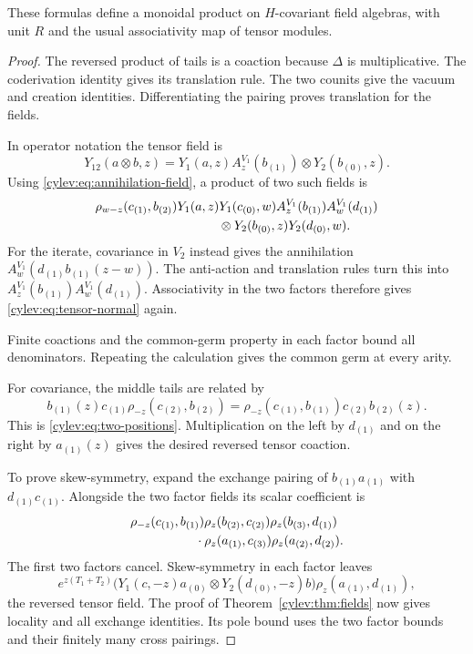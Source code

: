 \begin{theorem}\label{cylev:thm:tensor}
These formulas define a monoidal product on $H$-covariant field
algebras, with unit $R$ and the usual associativity map of tensor
modules.
\end{theorem}
\begin{proof}
The reversed product of tails is a coaction because $\Delta$ is
multiplicative. The coderivation identity gives its translation rule.
The two counits give the vacuum and creation identities.
Differentiating the pairing proves translation for the fields.

In operator notation the tensor field is
\[
 Y_{12}(a\otimes b,z)
       =Y_1(a,z)A_z^{V_1}(b_{(1)})\otimes Y_2(b_{(0)},z).
\]
Using \eqref{cylev:eq:annihilation-field}, a product of two such
fields is
\begin{equation}\label{cylev:eq:tensor-normal}
\begin{split}
 &\rho_{w-z}(c_{(1)},b_{(2)})
   Y_1(a,z)Y_1(c_{(0)},w)
   A_z^{V_1}(b_{(1)})A_w^{V_1}(d_{(1)})\\
 &\hspace{34mm}\otimes Y_2(b_{(0)},z)Y_2(d_{(0)},w).
\end{split}
\end{equation}
For the iterate, covariance in $V_2$ instead gives the annihilation
$A_w^{V_1}(d_{(1)}b_{(1)}(z-w))$.
The anti-action and translation rules turn this into
$A_z^{V_1}(b_{(1)})A_w^{V_1}(d_{(1)})$.
Associativity in the two factors therefore gives
\eqref{cylev:eq:tensor-normal} again.

Finite coactions and the common-germ property in each factor bound
all denominators. Repeating the calculation gives the common germ
at every arity.

For covariance, the middle tails are related by
\[
 b_{(1)}(z)c_{(1)}\rho_{-z}(c_{(2)},b_{(2)})
       =\rho_{-z}(c_{(1)},b_{(1)})c_{(2)}b_{(2)}(z).
\]
This is \eqref{cylev:eq:two-positions}.
Multiplication on the left by $d_{(1)}$ and on the right by
$a_{(1)}(z)$ gives the desired reversed tensor coaction.

To prove skew-symmetry, expand the exchange pairing of
$b_{(1)}a_{(1)}$ with $d_{(1)}c_{(1)}$.
Alongside the two factor fields its scalar coefficient is
\[
\begin{split}
 &\rho_{-z}(c_{(1)},b_{(1)})\rho_z(b_{(2)},c_{(2)})
   \rho_z(b_{(3)},d_{(1)})\\
 &\hspace{18mm}\cdot\rho_z(a_{(1)},c_{(3)})
                         \rho_z(a_{(2)},d_{(2)}).
\end{split}
\]
The first two factors cancel. Skew-symmetry in each factor leaves
\[
 e^{z(T_1+T_2)}
 \bigl(Y_1(c,-z)a_{(0)}\otimes Y_2(d_{(0)},-z)b\bigr)
             \rho_z(a_{(1)},d_{(1)}),
\]
the reversed tensor field.
The proof of Theorem~\ref{cylev:thm:fields} now gives locality and
all exchange identities. Its pole bound uses the two factor bounds
and their finitely many cross pairings.


\end{proof}
